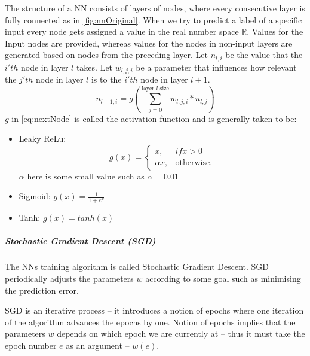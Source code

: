 \documentclass[dissertation.tex]{subfiles}
\begin{document}
The structure of a NN consists of layers of nodes, where every consecutive
layer is fully connected as in \autoref{fig:nnOriginal}.  When we try to
predict a label of a specific input every node gets assigned a value in the
real number space $\mathbb{R}$. Values for the Input nodes are provided,
whereas values for the nodes in non-input layers are generated based on nodes
from the preceding layer. Let $n_{l,i}$ be the value that the $i'th$ node in
layer $l$ takes. Let $w_{l,j,i}$ be a parameter that influences how relevant
the $j'th$ node in layer $l$ is to the $i'th$ node in layer $l+1$.
\begin{equation}
  n_{l+1,i} = g(\sum_{j = 0}^{\text{layer }l\text{ size}} w_{l,j,i}*n_{l,j})
  \label{eq:nextNode}
\end{equation}
$g$ in \autoref{eq:nextNode} is called the activation function and is generally 
taken to be:
\begin{itemize}
  \item{
      Leaky ReLu: 
      \begin{equation*}
        g(x) = \begin{cases}
          x, & if x > 0 \\
          \alpha{x}, & \text{otherwise}.
        \end{cases}
      \end{equation*}
      $\alpha$ here is some small value such as $\alpha = 0.01$
    }
  \item{
      Sigmoid: $g(x) = \frac{1}{1+e^x}$
    }
  \item{
      Tanh: $g(x) = tanh(x)$
    }
\end{itemize}


\subparagraph{Stochastic Gradient Descent (SGD)} The NNs training algorithm is
called Stochastic Gradient Descent. SGD periodically adjusts the parameters $w$
according to some goal such as minimising the prediction error. 

SGD is an iterative process -- it introduces a notion of epochs where one
iteration of the algorithm advances the epochs by one. Notion of epochs implies
that the parameters $w$ depends on which epoch we are currently at -- thus it
must take the epoch number $e$ as an argument -- $w(e)$.
\end{document}

